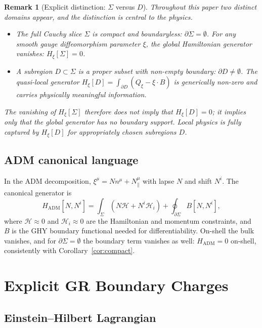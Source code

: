 \documentclass[12pt,a4paper]{article}
\newtheorem{remark}{Remark}[section]
\newcommand{\Sig}{\Sigma}           %
\newcommand{\pa}{\partial}          %
\newcommand{\Qxi}{Q_\xi}
\newcommand{\Hxi}{H_\xi}
\newcommand{\onshell}{\approx}
\begin{document}
\begin{remark}[Explicit distinction: $\Sig$ versus $D$]
\label{rem:SigD}
Throughout this paper two distinct domains appear, and
the distinction is central to the physics.
\begin{itemize}
\item The \emph{full Cauchy slice} $\Sig$ is compact and
  boundaryless: $\pa\Sig = \emptyset$. For any smooth gauge
  diffeomorphism parameter $\xi$, the global Hamiltonian
  generator vanishes: $\Hxi[\Sig] = 0$.
\item A \emph{subregion} $D\subset\Sig$ is a proper subset
  with non-empty boundary: $\pa D \neq \emptyset$.
  The quasi-local generator $\Hxi[D] = \int_{\pa D}(\Qxi
  - \xi\cdot B)$ is generically non-zero and carries
  physically meaningful information.
\end{itemize}
The vanishing of $\Hxi[\Sig]$ therefore does not imply
that $\Hxi[D] = 0$; it implies only that the global
generator has no boundary support. Local physics is
fully captured by $\Hxi[D]$ for appropriately chosen
subregions $D$.
\end{remark}

\subsection{ADM canonical language}

In the ADM decomposition, $\xi^\mu = N n^\mu + N^\mu_\parallel$
with lapse $N$ and shift $N^i$. The canonical generator is
\begin{equation}
  H_{\mathrm{ADM}}[N, N^i]
  = \int_\Sig (N\mathcal{H} + N^i \mathcal{H}_i)
  + \oint_{\pa\Sig} B[N, N^i],
  \label{eq:ADM}
\end{equation}
where $\mathcal{H}\onshell 0$ and $\mathcal{H}_i\onshell 0$
are the Hamiltonian and momentum constraints, and $B$ is
the GHY boundary functional needed for differentiability.
On-shell the bulk vanishes, and for $\pa\Sig = \emptyset$
the boundary term vanishes as well: $H_{\mathrm{ADM}} = 0$
on-shell, consistently with Corollary~\ref{cor:compact}.

\section{Explicit GR Boundary Charges}
\label{sec:charges}

\subsection{Einstein--Hilbert Lagrangian}
\end{document}
